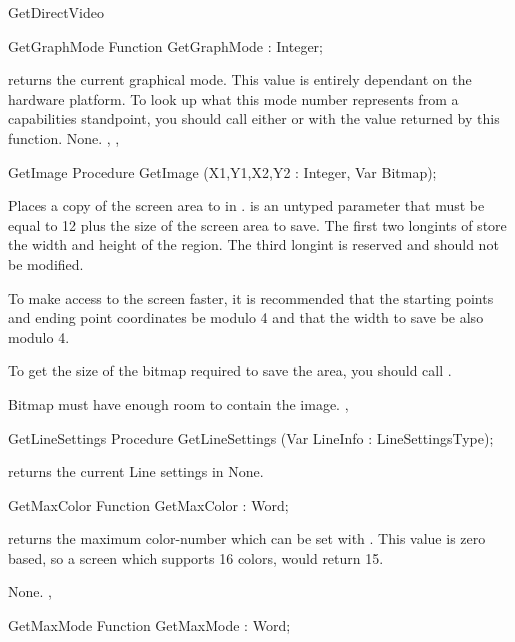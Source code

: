\begin{function}{GetDirectVideo}
\begin{function}{GetGraphMode}
\Declaration
Function GetGraphMode  : Integer;

\Description
{} returns the current graphical mode. This value is
entirely dependant on the hardware platform. To look up what this
mode number represents from a capabilities standpoint, you should
call either  or  with the
value returned by this function.
\Errors
None.
\SeeAlso
{}, , 
\end{function}

\begin{procedure}{GetImage}
\Declaration
Procedure GetImage (X1,Y1,X2,Y2 : Integer, Var Bitmap);

\Description
{}
Places a copy of the screen area  to  in .
 is an untyped parameter that must be equal to 12 plus the size
of the screen area to save. The first two longints of  store
the width and height of the region. The third longint is reserved and should
not be modified.

To make access to the screen faster, it is recommended that the starting
points and ending point coordinates be modulo 4 and that the width to
save be also modulo 4.

To get the size of the bitmap required to save the area, you should call
.

\Errors
Bitmap must have enough room to contain the image.
\SeeAlso
{},
\end{procedure}

\begin{procedure}{GetLineSettings}
\Declaration
Procedure GetLineSettings (Var LineInfo : LineSettingsType);

\Description
{} returns the current Line settings in
\Errors
None.
\SeeAlso
{}
\end{procedure}
\begin{function}{GetMaxColor}
\Declaration
Function GetMaxColor  : Word;

\Description
{} returns the maximum color-number which can
be set with . This value is zero based, so a screen
which supports 16 colors, would return 15.

\Errors
None.
\SeeAlso
{},
\end{function}
\begin{function}{GetMaxMode}
\Declaration
Function GetMaxMode  : Word;


\end{function}
\end{function}
